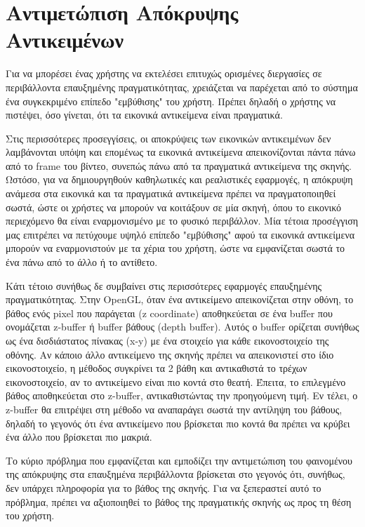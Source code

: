 \section{Αντιμετώπιση Απόκρυψης Αντικειμένων} \label{s:occlusion}




Για να μπορέσει ένας χρήστης να εκτελέσει επιτυχώς ορισμένες διεργασίες σε περιβάλλοντα επαυξημένης πραγματικότητας, χρειάζεται να παρέχεται από το σύστημα ένα συγκεκριμένο επίπεδο "εμβύθισης" του χρήστη. Πρέπει δηλαδή ο χρήστης να πιστέψει, όσο γίνεται, ότι τα εικονικά αντικείμενα είναι πραγματικά. 


Στις περισσότερες προσεγγίσεις, οι αποκρύψεις των εικονικών αντικειμένων δεν λαμβάνονται υπόψη και επομένως τα εικονικά αντικείμενα απεικονίζονται πάντα πάνω από το frame του βίντεο, συνεπώς πάνω από τα πραγματικά αντικείμενα της σκηνής. 
Ωστόσο, για να δημιουργηθούν καθηλωτικές και ρεαλιστικές εφαρμογές, η απόκρυψη ανάμεσα στα εικονικά και τα πραγματικά αντικείμενα πρέπει να πραγματοποιηθεί σωστά, ώστε οι χρήστες να μπορούν να κοιτάξουν σε μία σκηνή, όπου το εικονικό περιεχόμενο θα είναι εναρμονισμένο με το φυσικό περιβάλλον. Μία τέτοια προσέγγιση μας επιτρέπει να πετύχουμε υψηλό επίπεδο "εμβύθισης" αφού τα εικονικά αντικείμενα μπορούν να εναρμονιστούν με τα χέρια του χρήστη, ώστε να εμφανίζεται σωστά το ένα πάνω από το άλλο ή το αντίθετο. 

Κάτι τέτοιο συνήθως δε συμβαίνει στις περισσότερες εφαρμογές επαυξημένης πραγματικότητας. Στην OpenGL, όταν ένα αντικείμενο απεικονίζεται στην οθόνη, το βάθος ενός pixel που παράγεται (z coordinate) αποθηκεύεται σε ένα buffer που ονομάζεται z-buffer ή buffer βάθους (depth buffer). Αυτός ο buffer ορίζεται συνήθως ως ένα δισδιάστατος πίνακας (x-y) με ένα στοιχείο για κάθε εικονοστοιχείο της οθόνης. Αν κάποιο άλλο αντικείμενο της σκηνής πρέπει να απεικονιστεί στο ίδιο εικονοστοιχείο, η μέθοδος συγκρίνει τα 2 βάθη και αντικαθιστά το τρέχων εικονοστοιχείο, αν το αντικείμενο είναι πιο κοντά στο θεατή. Έπειτα, το επιλεγμένο βάθος αποθηκεύεται στο z-buffer, αντικαθιστώντας την προηγούμενη τιμή. Εν τέλει, ο z-buffer θα επιτρέψει στη μέθοδο να αναπαράγει σωστά την αντίληψη του βάθους, δηλαδή το γεγονός ότι ένα αντικείμενο που βρίσκεται πιο κοντά θα πρέπει να κρύβει ένα άλλο που βρίσκεται πιο μακριά.


Το κύριο πρόβλημα που εμφανίζεται και εμποδίζει την αντιμετώπιση του φαινομένου της απόκρυψης στα επαυξημένα περιβάλλοντα βρίσκεται στο γεγονός ότι, συνήθως, δεν υπάρχει πληροφορία για το βάθος της σκηνής. Για να ξεπεραστεί αυτό το πρόβλημα, πρέπει να αξιοποιηθεί το βάθος της πραγματικής σκηνής ως προς τη θέση του χρήστη. 


